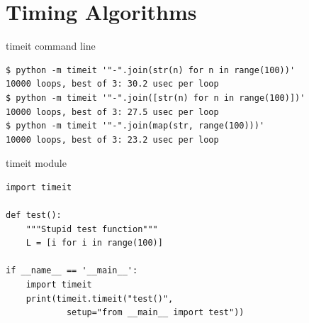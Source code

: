 \section{Timing Algorithms}

\begin{frame}[fragile]{timeit command line}
  \begin{verbatim}
$ python -m timeit '"-".join(str(n) for n in range(100))'
10000 loops, best of 3: 30.2 usec per loop
$ python -m timeit '"-".join([str(n) for n in range(100)])'
10000 loops, best of 3: 27.5 usec per loop
$ python -m timeit '"-".join(map(str, range(100)))'
10000 loops, best of 3: 23.2 usec per loop
  \end{verbatim}
\end{frame}

\begin{frame}[fragile]{timeit module}
  \begin{verbatim}
import timeit

def test():
    """Stupid test function"""
    L = [i for i in range(100)]

if __name__ == '__main__':
    import timeit
    print(timeit.timeit("test()",
            setup="from __main__ import test"))
  \end{verbatim}
\end{frame}




